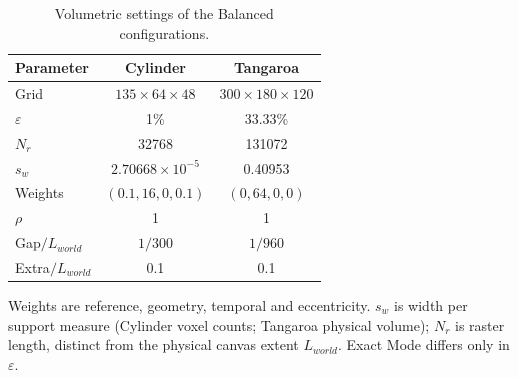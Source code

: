 \begin{table}[!tb]
\centering
\caption{Volumetric settings of the Balanced configurations.}
\label{tab:volume-parameters}
\footnotesize
\setlength{\tabcolsep}{2pt}
\renewcommand{\arraystretch}{0.95}
\begin{tabular}{@{}lcc@{}}
\toprule
Parameter & Cylinder & Tangaroa \\
\midrule
Grid & $135\times64\times48$ & $300\times180\times120$ \\
$\varepsilon$ & 1\% & 33.33\% \\
$N_r$ & 32768 & 131072 \\
$s_w$ & $2.70668\times10^{-5}$ & 0.40953 \\
Weights & $(0.1,16,0,0.1)$ & $(0,64,0,0)$ \\
$\rho$ & 1 & 1 \\
Gap$/L_{world}$ & $1/300$ & $1/960$ \\
Extra$/L_{world}$ & 0.1 & 0.1 \\
\bottomrule
\end{tabular}
\vspace{2pt}
\begin{minipage}{0.94\columnwidth}\footnotesize Weights are reference, geometry, temporal and eccentricity. $s_w$ is width per support measure (Cylinder voxel counts; Tangaroa physical volume); $N_r$ is raster length, distinct from the physical canvas extent $L_{world}$. Exact Mode differs only in $\varepsilon$.\end{minipage}
\end{table}
